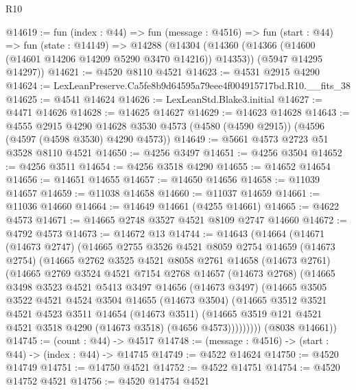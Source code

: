 \begin{lexlean}{R10}
\begin{coremodule}
@14619 := fun (index : @44) =>
  fun (message : @4516) =>
  fun (start : @44) =>
  fun (state : @14149) =>
  @14288
    (@14304
      (@14360 (@14366 (@14600 (@14601 @14206 @14209 @5290 @3470 @14216)) @14353))
      (@5947 @14295 @14297))
@14621 := @4520 @8110 @4521
@14623 := @4531 @2915 @4290
@14624 := LexLeanPreserve.Ca5fe8b9d64595a79eee4f004915717bd.R10.__fits_38
@14625 := @4541 @14624
@14626 := LexLeanStd.Blake3.initial
@14627 := @4471 @14626
@14628 := @14625 @14627
@14629 := @14623 @14628
@14643 := @4555
    @2915
    @4290
    @14628
    @3530
    @4573
    (@4580 (@4590 @2915))
    (@4596 (@4597 (@4598 @3530) @4290 @4573))
@14649 := @5661 @4573 @2723 @51 @3528 @8110 @4521
@14650 := @4256 @3497
@14651 := @4256 @3504
@14652 := @4256 @3511
@14654 := @4256 @3518 @4290
@14655 := @14652 @14654
@14656 := @14651 @14655
@14657 := @14650 @14656
@14658 := @11039 @14657
@14659 := @11038 @14658
@14660 := @11037 @14659
@14661 := @11036 @14660
@14664 := @14649 @14661 (@4255 @14661)
@14665 := @4622 @4573
@14671 := @14665 @2748 @3527 @4521 @8109 @2747 @14660
@14672 := @4792 @4573
@14673 := @14672 @13
@14744 := @14643
    (@14664
      (@14671
        (@14673 @2747)
        (@14665
          @2755
          @3526
          @4521
          @8059
          @2754
          @14659
          (@14673 @2754)
          (@14665
            @2762
            @3525
            @4521
            @8058
            @2761
            @14658
            (@14673 @2761)
            (@14665
              @2769
              @3524
              @4521
              @7154
              @2768
              @14657
              (@14673 @2768)
              (@14665
                @3498
                @3523
                @4521
                @5413
                @3497
                @14656
                (@14673 @3497)
                (@14665
                  @3505
                  @3522
                  @4521
                  @4524
                  @3504
                  @14655
                  (@14673 @3504)
                  (@14665
                    @3512
                    @3521
                    @4521
                    @4523
                    @3511
                    @14654
                    (@14673 @3511)
                    (@14665 @3519 @121 @4521 @4521 @3518 @4290 (@14673 @3518) (@4656 @4573)))))))))
      (@8038 @14661))
@14745 := (count : @44) -> @4517
@14748 := (message : @4516) -> (start : @44) -> (index : @44) -> @14745
@14749 := @4522 @14624
@14750 := @4520 @14749
@14751 := @14750 @4521
@14752 := @4522 @14751
@14754 := @4520 @14752 @4521
@14756 := @4520 @14754 @4521

\end{coremodule}
\end{lexlean}

